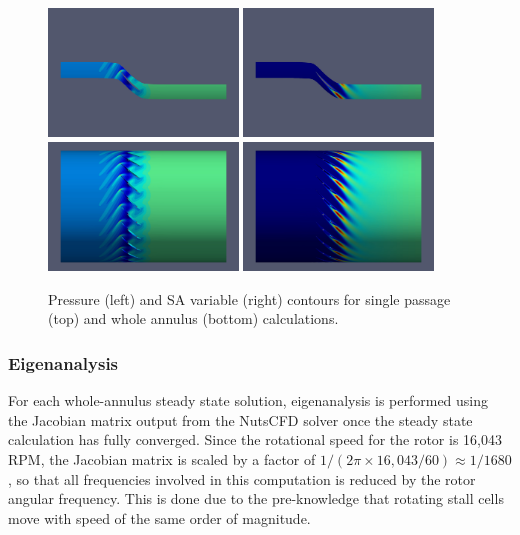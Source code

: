\documentclass[journal,final]{new-aiaa}
\begin{document}
\begin{figure}[htb]
	\centering   
	\includegraphics[width=0.45\textwidth]{pic/pressure-1passage.jpeg}
	\includegraphics[width=0.45\textwidth]{pic/sa-1passage.jpeg}\\    \includegraphics[width=0.45\textwidth]{pic/pressure-22passage.jpeg}
	\includegraphics[width=0.45\textwidth]{pic/sa-22passage.jpeg}
	\caption{Pressure (left) and SA variable (right) contours for
	single passage (top) and whole annulus (bottom) calculations.}
	\label{fig:r67-flow}
\end{figure}

\subsubsection{Eigenanalysis}

For each whole-annulus steady state solution, eigenanalysis
is performed using the Jacobian matrix output from the NutsCFD solver
once the steady state calculation has fully converged.
Since the rotational speed for the rotor is 16,043 RPM, the Jacobian
matrix is scaled by a factor of $1/(2\pi \times 16,043 / 60)\approx 1/1680$,
so that all frequencies involved in this computation is reduced by the
rotor angular frequency. This is done due to the pre-knowledge that
rotating stall cells move with speed of the same order of magnitude.
\end{document}
